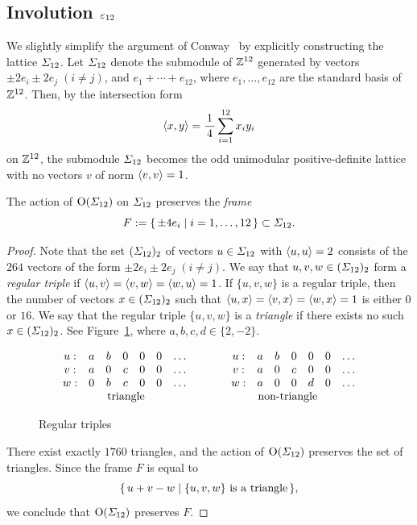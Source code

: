 \documentclass{amsart} %
\begin{document}
\subsection{Involution $\varepsilon_{12}$}\label{subsec:vep12}
%
We slightly simplify the argument of Conway~\cite[Chapter~10, Section~3.7]{theCSbook} 
by explicitly constructing the lattice $\varSigma_{12}$.
Let $\varSigma_{12}$ denote the submodule of $\mathord{\mathbb{Z}}^{12}$ generated by vectors 
$\pm 2 e_i\pm 2 e_j\; (i\ne j)$, 
and  $e_1+\cdots+e_{12}$,
where $e_1,\dots, e_{12}$ are the standard basis of $\mathord{\mathbb{Z}}^{12}$.
Then, by the intersection form 
\[
\langle x, y \rangle=\frac{1}{\,4\,} \sum_{i=1}^{12} x_i y_i
\]
on $\mathord{\mathbb{Z}}^{12}$, the submodule $\varSigma_{12}$ becomes the odd unimodular
positive-definite lattice with no vectors $v$ of norm $\langle v, v \rangle=1$.
%
\begin{lemma}\label{lem:frame}
The action of $\mathord{\mathrm{O}}(\varSigma_{12})$ on $\varSigma_{12}$ preserves
the \emph{frame}
\[
F:=\{\,{\pm 4 e_i}\mid {i=1, \dots, 12} \,\}\subset \varSigma_{12}.
\]
\end{lemma}
%
\begin{proof}
Note that the set $(\varSigma_{12})_2$ of vectors $u\in \varSigma_{12}$ with $\langle u, u \rangle=2$
consists of the $264$ vectors of the form $\pm 2 e_i\pm 2 e_j\; (i\ne j)$.
We say that $u, v, w\in( \varSigma_{12})_2$ form a \emph{regular triple} if 
$\langle u, v \rangle=\langle v, w \rangle=\langle w, u \rangle=1$.
If $\{u, v, w\}$ is a regular triple, then the number of 
vectors $x\in( \varSigma_{12})_2$ such that 
$\langle u, x \rangle=\langle v, x \rangle=\langle w, x \rangle=1$
is either $0$ or $16$.
We say that the regular triple $\{u, v, w\}$ is a \emph{triangle} if there exists no such $x\in (\varSigma_{12})_2$.
See Figure~\ref{fig:triangle},
where $a, b, c , d\in \{2, -2\}$.
%
\begin{figure}
{\small
\[
\begin{array}{ccccccc}
u: & a& b & 0 & 0 & 0 &\dots\\
v: &a&0 & c & 0 & 0 &\dots\\
w: & 0& b & c & 0 & 0 & \dots\\
& \rlap{\textrm{\;\;\;\;\;triangle}} && &
\end{array}
\qquad\quad
\begin{array}{ccccccc}
u: &a& b & 0 & 0 & 0 &\dots\\
v: &a&0 & c & 0 & 0 & \dots\\
w: &a& 0 & 0 & d & 0 & \dots\\
\rlap{ \textrm{\;\;\;\;\;non-triangle}} && & &
\end{array}
\]
}
\vskip -1mm
\caption{Regular triples}\label{fig:triangle}
\end{figure}
%
There exist exactly $1760$ triangles, and 
the action of $\mathord{\mathrm{O}}(\varSigma_{12})$ preserves the set of triangles.
Since 
 the frame $F$ is equal to
\[
\{\,{u+v-w}\mid {\textrm{$\{u, v, w\}$ is a triangle}} \,\},
\]
we conclude that $\mathord{\mathrm{O}}(\varSigma_{12})$ preserves $F$.
\end{proof}
\end{document}
